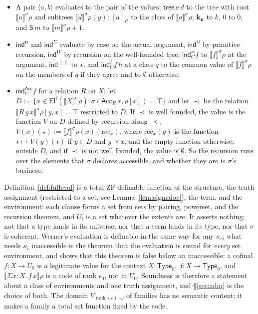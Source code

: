\documentclass[10pt]{article}
\newcommand{\N}{\mathbb{N}}
\newcommand{\Type}{\mathsf{Type}}
\newcommand{\ZF}{\mathrm{ZF}}
\newcommand{\rk}{\operatorname{rank}}
\newcommand{\sem}[1]{\llbracket #1\rrbracket}
\newcommand{\El}{\mathrm{El}}
\begin{document}
\begin{definition}
\begin{itemize}
  $\sem{f\,a}^\sigma\rho:=\sem f^\sigma\rho(\sem a^\sigma\rho)$.
\item A pair $\langle a,b\rangle$ evaluates to the pair of the values;
  $\mathsf{tree}\,a\,d$ to the tree with root $\sem a^\sigma\rho$ and
  subtrees $\sem d^\sigma\rho(y)$; $[a]_R$ to the class of
  $\sem a^\sigma\rho$; $\mathbf k_{\mathbf n}$ to $k$, $0$ to $0$, and
  $\mathsf S\,m$ to $\sem m^\sigma\rho+1$.
\item $\mathsf{ind}^{\mathbf n}$ and $\mathsf{ind}^\Sigma$ evaluate by
  case on the actual argument, $\mathsf{ind}^\N$ by primitive recursion,
  $\mathsf{ind}^W$ by recursion on the well-founded tree,
  $\mathsf{ind}^=_Cf$ to $\sem f^\sigma\rho$ at the argument,
  $\mathsf{ind}^{\|\|}$ to $\star$, and $\mathsf{ind}^/_Cf\,h$ at a class
  $q$ to the common value of $\sem f^\sigma\rho$ on the members of $q$ if
  they agree and to $\emptyset$ otherwise.
\item $\mathsf{ind}^{\mathsf{Acc}}_Cf$ for a relation $R$ on $X$: let
  $D:=\{x\in\El^{\mathrm f}(\sem X^\sigma\rho):\sigma(\mathsf{Acc}_R\,x,\rho[x])=\top\}$
  and let $\prec$ be the relation
  $\sem{R\,y\,x}^\sigma\rho[y,x]=\top$ restricted to $D$. If $\prec$ is
  well founded, the value is the function $V$ on $D$ defined by
  recursion along $\prec$, $V(x)(\star):=\sem f^\sigma\rho(x)(\mathrm{rec}_x)$,
  where $\mathrm{rec}_x(y)$ is the function $\star\mapsto V(y)(\star)$ if
  $y\in D$ and $y\prec x$, and the empty function otherwise; outside
  $D$, and if $\prec$ is not well founded, the value is $\emptyset$. So
  the recursion runs over the elements that $\sigma$ declares
  accessible, and whether they are is $\sigma$'s business.
\end{itemize}
\end{definition}

\begin{remark}
Definition~\ref{def:fulleval} is a total $\ZF$-definable function of the
structure, the truth assignment (restricted to a set, see
Lemma~\ref{lem:sigmaloc}), the term, and the environment: each clause
forms a set from sets by pairing, powerset, and the recursion theorem,
and $U_i$ is a set whatever the extents are. It asserts nothing: not
that a type lands in its universe, nor that a term lands in its type,
nor that $\sigma$ is coherent. Werner's evaluation is definable in the
same way for any $\kappa_i$; what needs $\kappa_i$ inaccessible is the
theorem that the evaluation is sound for \emph{every} set environment,
and \cite[Prop.~4.4]{paper1} shows that this theorem is false below an
inaccessible: a cofinal $f:X\to U_0$ is a legitimate value for the
context $X{:}\Type_0,\ f{:}X\to\Type_0$, and
$\sem{\Sigma x{:}X.\,f\,x}\rho$ is a code of rank $\epsilon_0$, not in
$U_0$. Soundness is therefore a statement about a class of environments
and one truth assignment, and \S\ref{sec:adm} is the choice of both. The
domain $V_{\rk(c)\cdot\omega}$ of families has no semantic content; it
makes a family a total set function fixed by the code.
\end{remark}
\end{document}

